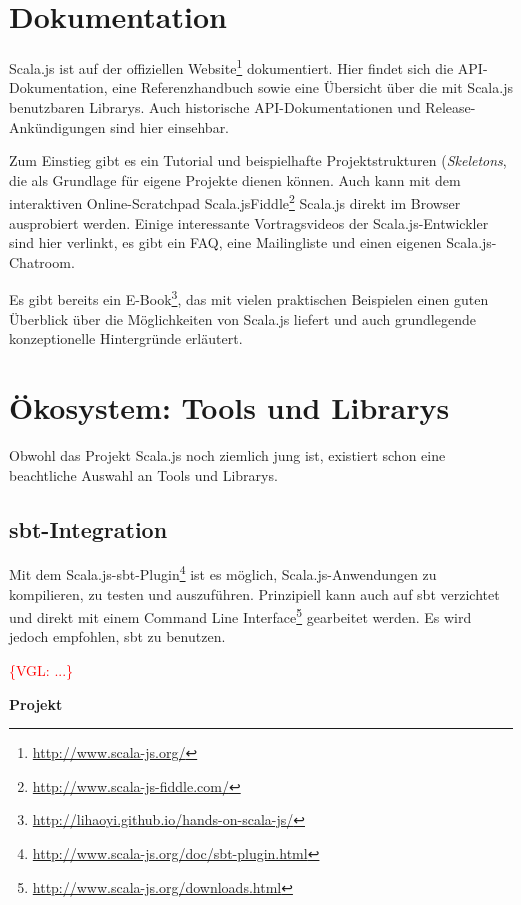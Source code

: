 \documentclass[a4paper, 12pt, hidelinks, listof=totoc, listoftables=totoc, bibliography=totoc]{scrreprt}
\newcommand{\TODOi}[1]{\textcolor{red}{\{#1\}}}
\newcommand{\MyMiniSec}[1]{\rmfamily\fontsize{12}{15}\selectfont
	\vspace{7pt}\textbf{#1} %
}
\begin{document}
\section{Dokumentation}

Scala.js ist auf der offiziellen Website\footnote{\url{http://www.scala-js.org/}} dokumentiert. Hier findet sich die \ac{API}-Dokumentation, eine Referenzhandbuch sowie eine Übersicht über die mit Scala.js benutzbaren Librarys. Auch historische \ac{API}-Dokumentationen und  Release-Ankündigungen sind hier einsehbar.

Zum Einstieg gibt es ein Tutorial und beispielhafte Projektstrukturen (\emph{Skeletons}, die als Grundlage für eigene Projekte dienen können. Auch kann mit dem interaktiven Online-Scratchpad Scala.jsFiddle\footnote{\url{http://www.scala-js-fiddle.com/}} Scala.js direkt im Browser ausprobiert werden. Einige interessante Vortragsvideos der Scala.js-Entwickler sind hier verlinkt, es gibt ein FAQ, eine Mailingliste und einen eigenen Scala.js-Chatroom.

Es gibt bereits ein E-Book\footnote{\url{http://lihaoyi.github.io/hands-on-scala-js/}}, das mit vielen praktischen Beispielen einen guten Überblick über die Möglichkeiten von Scala.js liefert und auch grundlegende konzeptionelle Hintergründe erläutert.


\section{Ökosystem: Tools und Librarys}\label{sec:sjs-libs}

Obwohl das Projekt Scala.js noch ziemlich jung ist, existiert schon eine beachtliche Auswahl an Tools und Librarys. 


\subsection{sbt-Integration}\label{subsec:sjs-sbt}

Mit dem Scala.js-sbt-Plugin\footnote{\url{http://www.scala-js.org/doc/sbt-plugin.html}} ist es möglich, Scala.js-Anwendungen zu kompilieren, zu testen und auszuführen.
Prinzipiell kann auch auf sbt verzichtet und direkt mit einem Command Line Interface\footnote{\url{http://www.scala-js.org/downloads.html}} gearbeitet werden. Es wird jedoch empfohlen, sbt zu benutzen.

\TODOi{VGL: ...}

\MyMiniSec{Projekt}
\end{document}
